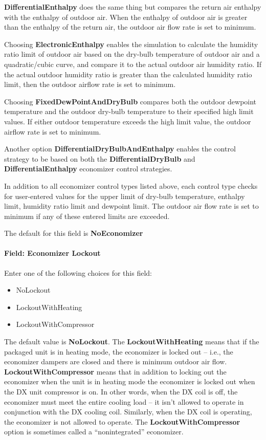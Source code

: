 \textbf{DifferentialEnthalpy} does the same thing but compares the return air enthalpy with the enthalpy of outdoor air. When the enthalpy of outdoor air is greater than the enthalpy of the return air, the outdoor air flow rate is set to minimum.

Choosing \textbf{ElectronicEnthalpy} enables the simulation to calculate the humidity ratio limit of outdoor air based on the dry-bulb temperature of outdoor air and a quadratic/cubic curve, and compare it to the actual outdoor air humidity ratio. If the actual outdoor humidity ratio is greater than the calculated humidity ratio limit, then the outdoor airflow rate is set to minimum.

Choosing \textbf{FixedDewPointAndDryBulb} compares both the outdoor dewpoint temperature and the outdoor dry-bulb temperature to their specified high limit values. If either outdoor temperature exceeds the high limit value, the outdoor airflow rate is set to minimum.

Another option \textbf{DifferentialDryBulbAndEnthalpy} enables the control strategy to be based on both the \textbf{DifferentialDryBulb} and \textbf{DifferentialEnthalpy} economizer control strategies.

In addition to all economizer control types listed above, each control type checks for user-entered values for the upper limit of dry-bulb temperature, enthalpy limit, humidity ratio limit and dewpoint limit. The outdoor air flow rate is set to minimum if any of these entered limits are exceeded.

The default for this field is \textbf{NoEconomizer}

\paragraph{Field: Economizer Lockout}\label{field-economizer-lockout-2-000}

Enter one of the following choices for this field:

\begin{itemize}
\item
  NoLockout
\item
  LockoutWithHeating
\item
  LockoutWithCompressor
\end{itemize}

The default value is \textbf{NoLockout}. The \textbf{LockoutWithHeating} means that if the packaged unit is in heating mode, the economizer is locked out -- i.e., the economizer dampers are closed and there is minimum outdoor air flow. \textbf{LockoutWithCompressor} means that in addition to locking out the economizer when the unit is in heating mode the economizer is locked out when the DX unit compressor is on. In other words, when the DX coil is off, the economizer must meet the entire cooling load -- it isn't allowed to operate in conjunction with the DX cooling coil. Similarly, when the DX coil is operating, the economizer is not allowed to operate. The \textbf{LockoutWithCompressor} option is sometimes called a ``nonintegrated'' economizer.

